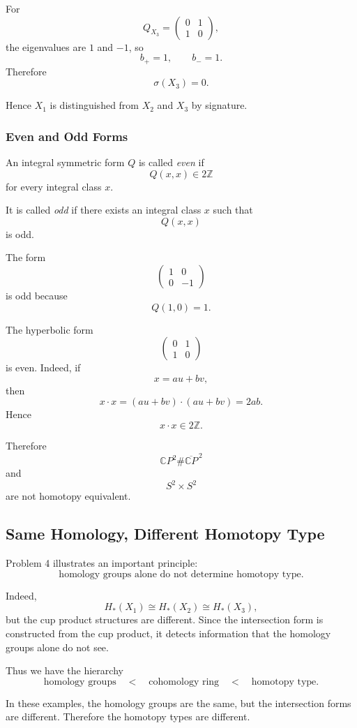 \documentclass[12pt,a4paper]{article}
\theoremstyle{notespace}
\begin{document}
For
\[
Q_{X_3}
=
\begin{pmatrix}
	0&1\\
	1&0
\end{pmatrix},
\]
the eigenvalues are \(1\) and \(-1\), so
\[
b_+=1,
\qquad
b_-=1.
\]
Therefore
\[
\sigma(X_3)=0.
\]

Hence \(X_1\) is distinguished from \(X_2\) and \(X_3\) by signature.

\subsubsection{Even and Odd Forms}

An integral symmetric form \(Q\) is called \emph{even} if
\[
Q(x,x)\in 2\mathbb Z
\]
for every integral class \(x\).

It is called \emph{odd} if there exists an integral class \(x\) such that
\[
Q(x,x)
\]
is odd.

The form
\[
\begin{pmatrix}
	1&0\\
	0&-1
\end{pmatrix}
\]
is odd because
\[
Q(1,0)=1.
\]

The hyperbolic form
\[
\begin{pmatrix}
	0&1\\
	1&0
\end{pmatrix}
\]
is even. Indeed, if
\[
x=au+bv,
\]
then
\[
x\cdot x
=
(au+bv)\cdot(au+bv)
=
2ab.
\]
Hence
\[
x\cdot x\in 2\mathbb Z.
\]

Therefore
\[
\mathbb CP^2\#\overline{\mathbb CP}^{\,2}
\]
and
\[
S^2\times S^2
\]
are not homotopy equivalent.

\subsection{Same Homology, Different Homotopy Type}

Problem 4 illustrates an important principle:
\[
\text{homology groups alone do not determine homotopy type}.
\]

Indeed,
\[
H_*(X_1)\cong H_*(X_2)\cong H_*(X_3),
\]
but the cup product structures are different. Since the intersection form is
constructed from the cup product, it detects information that the homology groups
alone do not see.

Thus we have the hierarchy
\[
\text{homology groups}
\quad < \quad
\text{cohomology ring}
\quad < \quad
\text{homotopy type}.
\]

In these examples, the homology groups are the same, but the intersection forms
are different. Therefore the homotopy types are different.
\end{document}
